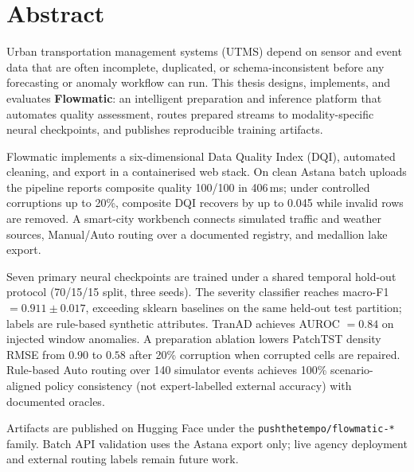 %
%
\chapter{Abstract}
\begin{SingleSpace}
Urban transportation management systems (UTMS) depend on sensor and event data that are often incomplete, duplicated, or schema-inconsistent before any forecasting or anomaly workflow can run. This thesis designs, implements, and evaluates \textbf{Flowmatic}: an intelligent preparation and inference platform that automates quality assessment, routes prepared streams to modality-specific neural checkpoints, and publishes reproducible training artifacts.

Flowmatic implements a six-dimensional Data Quality Index (DQI), automated cleaning, and export in a containerised web stack. On clean Astana batch uploads the pipeline reports composite quality 100/100 in 406\,ms; under controlled corruptions up to 20\%, composite DQI recovers by up to 0.045 while invalid rows are removed. A smart-city workbench connects simulated traffic and weather sources, Manual/Auto routing over a documented registry, and medallion lake export.

Seven primary neural checkpoints are trained under a shared temporal hold-out protocol (70/15/15 split, three seeds). The severity classifier reaches macro-F1 $= 0.911 \pm 0.017$, exceeding sklearn baselines on the same held-out test partition; labels are rule-based synthetic attributes. TranAD achieves AUROC $= 0.84$ on injected window anomalies. A preparation ablation lowers PatchTST density RMSE from $0.90$ to $0.58$ after 20\% corruption when corrupted cells are repaired. Rule-based Auto routing over 140 simulator events achieves 100\% scenario-aligned policy consistency (not expert-labelled external accuracy) with documented oracles.

Artifacts are published on Hugging Face under the \texttt{pushthetempo/flowmatic-*} family. Batch API validation uses the Astana export only; live agency deployment and external routing labels remain future work.

\end{SingleSpace}

